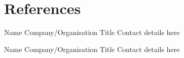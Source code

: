 \documentclass[a4paper,english]{friggeri-cv} %
\begin{document}

\section{References}


\begin{entrylist}


\entry
{}
{Name}
{Company/Organisation}
{Title}
{
Contact details here
}


\entry
{}
{Name}
{Company/Organisation}
{Title}
{
Contact details here
}

\end{entrylist} 

\end{document}
